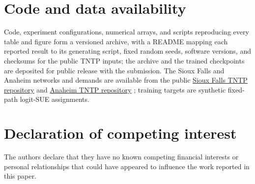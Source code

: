 \documentclass[a4paper,fleqn]{cas-sc}
\begin{document}
\section*{Code and data availability}
Code, experiment configurations, numerical arrays, and scripts
reproducing every table and figure form a versioned archive, with a
README mapping each reported result to its generating script, fixed
random seeds, software versions, and checksums for the public TNTP
inputs; the archive and the trained checkpoints are deposited for
public release with the submission.
The Sioux Falls and Anaheim networks and demands are available from the public
\href{https://github.com/bstabler/TransportationNetworks/tree/master/SiouxFalls}{Sioux Falls TNTP repository}
and \href{https://github.com/bstabler/TransportationNetworks/tree/master/Anaheim}{Anaheim TNTP repository}
\citep{tnfrc2024transportation}; training targets are synthetic fixed-path
logit-SUE assignments.
\section*{Declaration of competing interest}
The authors declare that they have no known competing financial interests
or personal relationships that could have appeared to influence the work
reported in this paper.
\FloatBarrier

\setlength{\bibsep}{0.8pt plus 0.2pt}

\appendix
{}



\end{document}
